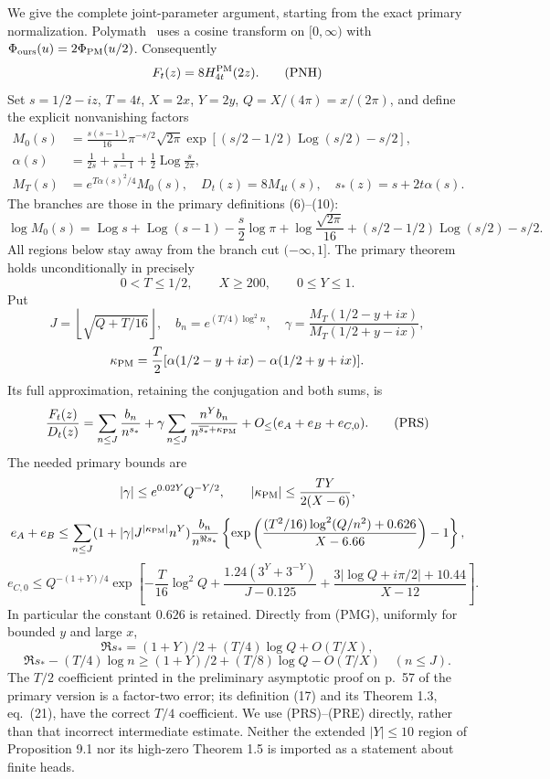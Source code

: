 \documentclass[11pt]{article}
\theoremstyle{remark}\newtheorem{remark}[theorem]{Remark}
\begin{document}
We give the complete joint-parameter argument, starting from the exact
primary normalization. Polymath~\cite[Theorem 1.3, printed p.~6,
eqs.~(13)--(24)]{PolymathHeat} uses a cosine transform on $[0,\infty)$
with $\Phi_{\rm ours}(u)=2\Phi_{\rm PM}(u/2)$. Consequently
\[
 F_t(z)=8H^{\rm PM}_{4t}(2z).                            \tag{PNH}
\]
Set $s=1/2-iz$, $T=4t$, $X=2x$, $Y=2y$, $Q=X/(4\pi)=x/(2\pi)$,
and define the explicit nonvanishing factors
\[
 \begin{split}
 M_0(s)&=\frac{s(s-1)}{16}\pi^{-s/2}\sqrt{2\pi}
  \exp\left[(s/2-1/2)\operatorname{Log}(s/2)-s/2\right],\\
 \alpha(s)&=\frac1{2s}+\frac1{s-1}
                         +\frac12\operatorname{Log}\frac{s}{2\pi},\\
 M_T(s)&=e^{T\alpha(s)^2/4}M_0(s),\quad
 D_t(z)=8M_{4t}(s),\quad s_*(z)=s+2t\alpha(s).
 \end{split}                                          \tag{PMG}
\]
The branches are those in the primary definitions (6)--(10):
\[
 \log M_0(s)=\operatorname{Log}s+\operatorname{Log}(s-1)
 -\frac s2\log\pi+\log\frac{\sqrt{2\pi}}{16}
 +(s/2-1/2)\operatorname{Log}(s/2)-s/2.
\]
All regions below stay away from the branch cut $(-\infty,1]$.
The primary theorem holds unconditionally in precisely
\[
 0<T\le1/2,\qquad X\ge200,\qquad 0\le Y\le1.
\]
Put
\[
 J=\left\lfloor\sqrt{Q+T/16}\right\rfloor,
 \quad b_n=e^{(T/4)\log^2 n},
 \quad
 \gamma=\frac{M_T(1/2-y+ix)}{M_T(1/2+y-ix)},
\]
\[
 \kappa_{\rm PM}=\frac T2
       [\alpha(1/2-y+ix)-\alpha(1/2+y+ix)].
\]
Its full approximation, retaining the conjugation and both sums, is
\[
 \frac{F_t(z)}{D_t(z)}
  =\sum_{n\le J}\frac{b_n}{n^{s_*}}
       +\gamma\sum_{n\le J}\frac{n^Yb_n}{n^{\overline{s_*}+\kappa_{\rm PM}}}
       +O_{\le}(e_A+e_B+e_{C,0}).                       \tag{PRS}
\]
The needed primary bounds are
\[
 |\gamma|\le e^{0.02Y}Q^{-Y/2},\qquad
 |\kappa_{\rm PM}|\le\frac{TY}{2(X-6)},
\]
\[
 e_A+e_B\le\sum_{n\le J}(1+|\gamma|J^{|\kappa_{\rm PM}|}n^Y)
  \frac{b_n}{n^{\Re s_*}}
 \left\{\exp\left(\frac{(T^2/16)\log^2(Q/n^2)+0.626}{X-6.66}\right)-1\right\},
\]
\[
 e_{C,0}\le Q^{-(1+Y)/4}
 \exp\left[-\frac T{16}\log^2Q
 +\frac{1.24(3^Y+3^{-Y})}{J-0.125}
 +\frac{3|\log Q+i\pi/2|+10.44}{X-12}\right].          \tag{PRE}
\]
In particular the constant $0.626$ is retained. Directly from (PMG),
uniformly for bounded $y$ and large $x$,
\[
 \Re s_*=(1+Y)/2+(T/4)\log Q+O(T/X),
\]
\[
 \Re s_*-(T/4)\log n
       \ge(1+Y)/2+(T/8)\log Q-O(T/X)\quad(n\le J).    \tag{PNE}
\]
The $T/2$ coefficient printed in the preliminary asymptotic proof on
p.~57 of the primary version is a factor-two error;
its definition (17) and its Theorem 1.3, eq.~(21), have the correct
$T/4$ coefficient. We use (PRS)--(PRE) directly, rather than that
incorrect intermediate estimate. Neither the extended $|Y|\le10$
region of Proposition 9.1 nor its high-zero Theorem 1.5 is imported
as a statement about finite heads.
\end{document}
